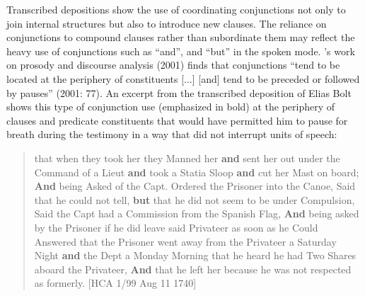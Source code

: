 Transcribed depositions show the use of coordinating conjunctions not only to join internal structures but also to introduce new clauses. The reliance on conjunctions to compound clauses rather than subordinate them may reflect the heavy use of conjunctions such as “and”, and “but” in the spoken mode. \citeauthor{Wennerstrom2001}’s work on prosody and discourse analysis (2001) finds that conjunctions “tend to be located at the periphery of constituents [...] [and] tend to be preceded or followed by pauses” (2001: 77). An excerpt from the transcribed deposition of Elias Bolt shows this type of conjunction use (emphasized in bold) at the periphery of clauses and predicate constituents that would have permitted him to pause for breath during the testimony in a way that did not interrupt units of speech:

\begin{quotation}
that when they took her they Manned her \textbf{and} sent her out under the Command of a Lieut \textbf{and} took a Statia Sloop \textbf{and} cut her Mast on board; \textbf{And} being Asked of the Capt. Ordered the Prisoner into the Canoe, Said that he could not tell, \textbf{but} that he did not seem to be under Compulsion, Said the Capt had a Commission from the Spanish Flag, \textbf{And} being asked by the Prisoner if he did leave said Privateer as soon as he Could Answered that the Prisoner went away from the Privateer a Saturday Night \textbf{and} the Dept a Monday Morning that he heard he had Two Shares aboard the Privateer, \textbf{And} that he left her because he was not respected as formerly. [HCA 1/99  Aug 11 1740]
\end{quotation}

